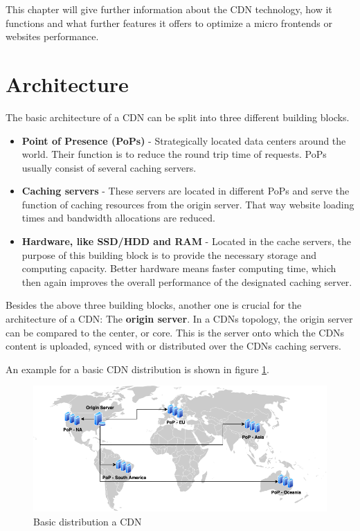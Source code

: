 This chapter will give further information about the CDN technology, how it functions and what further features it offers to optimize a micro frontends or websites performance.

\section{Architecture}

The basic architecture of a CDN can be split into three different building blocks.

\begin{itemize}
	\item \textbf{Point of Presence (PoPs)} - Strategically located data centers around the world. Their function is to reduce the round trip time of requests. PoPs usually consist of several caching servers.
	\item \textbf{Caching servers} - These servers are located in different PoPs and serve the function of caching resources from the origin server. That way website loading times and bandwidth allocations are reduced.
	\item \textbf{Hardware, like SSD/HDD and RAM} - Located in the cache servers, the purpose of this building block is to provide the necessary storage and computing capacity. Better hardware means faster computing time, which then again improves the overall performance of the designated caching server.
\end{itemize}

Besides the above three building blocks, another one is crucial for the architecture of a CDN: The \textbf{origin server}. In a CDNs topology, the origin server can be compared to the center, or core. This is the server onto which the CDNs content is uploaded, synced with or distributed over the CDNs caching servers.\cite{cdn_origin_server}

An example for a basic CDN distribution is shown in figure \ref{fig:cdn_general_arch}.

\begin{figure}[!h]
	\centering
	\includegraphics[width=1\textwidth]{Figures/basic_cdn_arch.drawio.png}
	\caption{Basic distribution a CDN}
	\label{fig:cdn_general_arch}
\end{figure}

